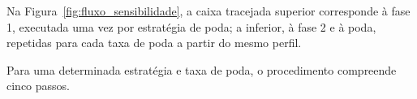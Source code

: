 Na Figura~\ref{fig:fluxo_sensibilidade}, a caixa tracejada superior corresponde à fase 1,
executada uma vez por estratégia de poda; a inferior, à fase 2 e à poda, repetidas para cada
taxa de poda a partir do mesmo perfil.

Para uma determinada estratégia e taxa de poda, o procedimento compreende cinco passos.

